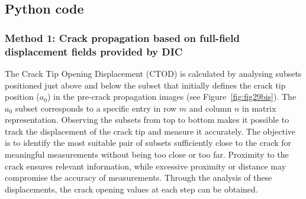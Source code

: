 \documentclass[3p,times,procedia]{elsarticle}
\begin{document}


\subsection{Python code}

\subsubsection{Method 1: Crack propagation based on full-field displacement fields provided by DIC}

The Crack Tip Opening Displacement (CTOD) is calculated by analysing subsets positioned just above and below the subset that initially defines the crack tip position ($a_0$) in the pre-crack propagation images (see Figure~\ref{fig:fig29bis}). The $a_0$ subset corresponds to a specific entry in row $m$ and column $n$ in matrix representation. Observing the subsets from top to bottom makes it possible to track the displacement of the crack tip and measure it accurately. The objective is to identify the most suitable pair of subsets sufficiently close to the crack for meaningful measurements without being too close or too far. Proximity to the crack ensures relevant information, while excessive proximity or distance may compromise the accuracy of measurements. Through the analysis of these displacements, the crack opening values at each step can be obtained.
\end{document}
